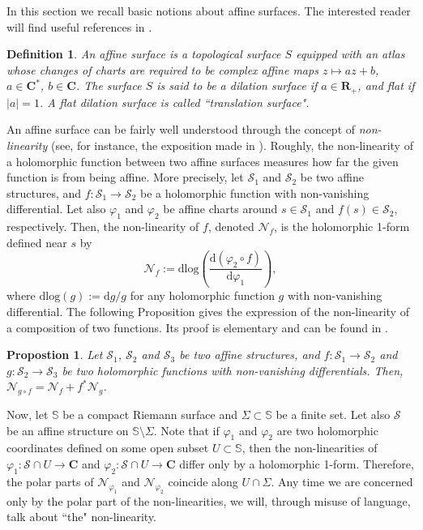 \documentclass[11pt]{article}
\newtheorem{prop}[thm]{Propostion}
\newtheorem*{definition}{Definition}
\begin{document}
In this section we recall basic notions about affine surfaces. The interested reader will find useful references in \cite{DuryevFougeronGhazouani}.

\begin{definition}
    An affine surface is a topological surface $S$ equipped with an atlas whose changes of charts are required to be complex affine maps $z\mapsto az+b$, $a\in\mathbf{C}^{*}$, $b\in\mathbf{C}$. The surface $S$ is said to be a dilation surface if $a\in\mathbf{R}_{+}$, and flat if $\lvert a\rvert=1$. A flat dilation surface is called ``translation surface".
\end{definition}

An affine surface can be fairly well understood through the concept of \textit{non-linearity} (see, for instance, the exposition made in \cite{BuffRaissy}). Roughly, the non-linearity of a holomorphic function between two affine surfaces measures how far the given function is from being affine. More precisely, let $\mathcal{S}_{1}$ and $\mathcal{S}_{2}$ be two affine structures, and $f:\mathcal{S}_{1}\rightarrow \mathcal{S}_{2}$ be a holomorphic function with non-vanishing differential. Let also $\varphi_{1}$ and $\varphi_{2}$ be affine charts around $s\in\mathcal{S}_{1}$ and $f\left(s\right)\in\mathcal{S}_{2}$, respectively. Then, the non-linearity of $f$, denoted $\mathcal{N}_{f}$, is the holomorphic 1-form defined near $s$ by
\[
\mathcal{N}_{f}:=\text{dlog}\left(\frac{\text{d}\left(\varphi_{2}\circ f\right)}{\text{d}\varphi_{1}}\right),
\]
where $\text{dlog}\left(g\right):=\text{d}g/g$ for any holomorphic function $g$ with non-vanishing differential. The following Proposition gives the expression of the non-linearity of a composition of two functions. Its proof is elementary and can be found in \cite{BuffRaissy}.

\begin{prop}
\label{prop:chain}
    Let $\mathcal{S}_{1}$, $\mathcal{S}_{2}$ and $\mathcal{S}_{3}$ be two affine structures, and $f:\mathcal{S}_{1}\rightarrow \mathcal{S}_{2}$ and $g:\mathcal{S}_{2}\rightarrow \mathcal{S}_{3}$ be two holomorphic functions with non-vanishing differentials. Then, $\mathcal{N}_{g\circ f}=\mathcal{N}_{f}+f^{*}\mathcal{N}_{g}$.
\end{prop}

Now, let $\mathbb{S}$ be a compact Riemann surface and $\Sigma\subset\mathbb{S}$ be a finite set. Let also $\mathcal{S}$ be an affine structure on $\mathbb{S}\setminus\Sigma$. Note that if $\varphi_{1}$ and $\varphi_{2}$ are two holomorphic coordinates defined on some open subset $U\subset\mathbb{S}$, then the non-linearities of $\varphi_{1}:\mathcal{S}\cap U\rightarrow\mathbf{C}$ and $\varphi_{2}:\mathcal{S}\cap U\rightarrow\mathbf{C}$ differ only by a holomorphic 1-form. Therefore, the polar parts of $\mathcal{N}_{\varphi_{1}}$ and $\mathcal{N}_{\varphi_{2}}$ coincide along $U\cap\Sigma$. Any time we are concerned only by the polar part of the non-linearities, we will, through misuse of language, talk about ``the" non-linearity.
\end{document}
